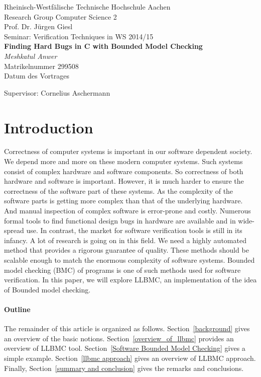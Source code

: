 \documentclass[14pt]{article}
\begin{document}
\begin{center}

    Rheinisch-Westf\"alische Technische Hochschule Aachen \\
    Research Group Computer Science 2\\
    Prof. Dr. J\"urgen Giesl\\[6ex]
    Seminar: Verification Techniques in WS 2014/15\\[12ex]                          %
   
    \LARGE
    \textbf{Finding Hard Bugs in C with Bounded Model Checking} \\[6ex]
    \textit{Meshkatul Anwer} \\[6ex]
    \Large
    Matrikelnummer 299508 \\[6ex]
    Datum des Vortrages

    \vfill
    \Large Supervisor: Cornelius Aschermann
	    
\end{center}


\section{Introduction}
Correctness of computer systems is important in our software dependent society. We depend more and more on these modern computer systems. Such systems consist of complex hardware and software components. So correctness of both hardware and software is important. However, it is much harder to ensure the correctness of the software part of these systems. As the complexity of the software parts is getting more complex than that of the underlying hardware. And manual inspection of complex software is error-prone and costly. Numerous formal tools to find functional design bugs in hardware are available and in wide-spread use. In contrast, the market for software verification tools is still in its infancy. A lot of research is going on in this field. We need a highly automated method that provides a rigorous guarantee of quality. These methods should be scalable enough to match the enormous complexity of software systems. Bounded model checking (BMC) of programs is one of such methods used for software verification. In this paper, we will explore LLBMC, an implementation of the idea of Bounded model checking.


\paragraph{Outline}
The remainder of this article is organized as follows.
Section~\ref{background} gives an overview of the basic notions.
Section~\ref{overview_of_llbmc} provides an overview of LLBMC tool.
Section~\ref{Software Bounded Model Checking} gives a simple example.
Section~\ref{llbmc approach} gives an overview of LLBMC approach.
Finally, Section~\ref{summary and conclusion} gives the remarks and conclusions.
\end{document}
